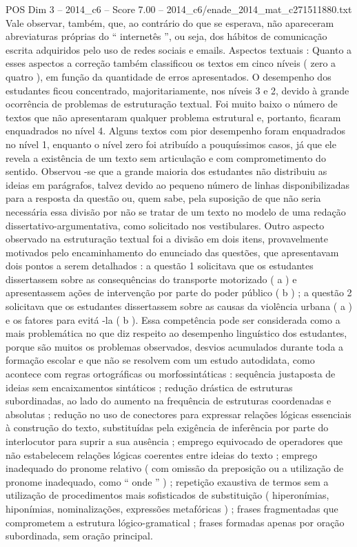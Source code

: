 \begin{textsample}{POS Dim 3 – 2014\_c6 – Score 7.00 – 2014\_c6/enade\_2014\_mat\_c271511880.txt}
Vale observar, também, que, ao contrário do que se esperava, não apareceram abreviaturas próprias do “ internetês ”, ou seja, dos hábitos de comunicação escrita adquiridos pelo uso de redes sociais e emails.
Aspectos textuais : Quanto a esses aspectos a correção também classificou os textos em cinco níveis ( zero a quatro ), em função da quantidade de erros apresentados.
O desempenho dos estudantes ficou concentrado, majoritariamente, nos níveis 3 e 2, devido à grande ocorrência de problemas de estruturação textual.
Foi muito baixo o número de textos que não apresentaram qualquer problema estrutural e, portanto, ficaram enquadrados no nível 4.
Alguns textos com pior desempenho foram enquadrados no nível 1, enquanto o nível zero foi atribuído a pouquíssimos casos, já que ele revela a existência de um texto sem articulação e com comprometimento do sentido.
Observou -se que a grande maioria dos estudantes não distribuiu as ideias em parágrafos, talvez devido ao pequeno número de linhas disponibilizadas para a resposta da questão ou, quem sabe, pela suposição de que não seria necessária essa divisão por não se tratar de um texto no modelo de uma redação dissertativo-argumentativa, como solicitado nos vestibulares.
Outro aspecto observado na estruturação textual foi a divisão em dois itens, provavelmente motivados pelo encaminhamento do enunciado das questões, que apresentavam dois pontos a serem detalhados : a questão 1 solicitava que os estudantes dissertassem sobre as consequências do transporte motorizado ( a ) e apresentassem ações de intervenção por parte do poder público ( b ) ; a questão 2 solicitava que os estudantes dissertassem sobre as causas da violência urbana ( a ) e os fatores para evitá -la ( b ).
Essa competência pode ser considerada como a mais problemática no que diz respeito ao desempenho linguístico dos estudantes, porque são muitos os problemas observados, desvios acumulados durante toda a formação escolar e que não se resolvem com um estudo autodidata, como acontece com regras ortográficas ou morfossintáticas : sequência justaposta de ideias sem encaixamentos sintáticos ; redução drástica de estruturas subordinadas, ao lado do aumento na frequência de estruturas coordenadas e absolutas ; redução no uso de conectores para expressar relações lógicas essenciais à construção do texto, substituídas pela exigência de inferência por parte do interlocutor para suprir a sua ausência ; emprego equivocado de operadores que não estabelecem relações lógicas coerentes entre ideias do texto ; emprego inadequado do pronome relativo ( com omissão da preposição ou a utilização de pronome inadequado, como “ onde ” ) ; repetição exaustiva de termos sem a utilização de procedimentos mais sofisticados de substituição ( hiperonímias, hiponímias, nominalizações, expressões metafóricas ) ; frases fragmentadas que comprometem a estrutura lógico-gramatical ; frases formadas apenas por oração subordinada, sem oração principal.

\end{textsample}
